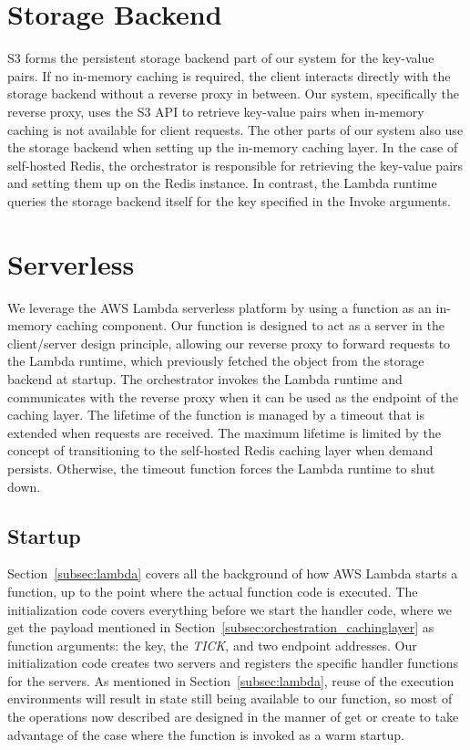 \section{Storage Backend}
\label{sec:storage_backend}
S3 forms the persistent storage backend part of our system for the key-value pairs. If no in-memory caching is required, the client interacts directly with the storage backend without a reverse proxy in between. Our system, specifically the reverse proxy, uses the S3 API to retrieve key-value pairs when in-memory caching is not available for client requests. The other parts of our system also use the storage backend when setting up the in-memory caching layer. In the case of self-hosted Redis, the orchestrator is responsible for retrieving the key-value pairs and setting them up on the Redis instance. In contrast, the Lambda runtime queries the storage backend itself for the key specified in the Invoke arguments.

\section{Serverless}
\label{sec:serverless}
We leverage the AWS Lambda serverless platform by using a function as an in-memory caching component. Our function is designed to act as a server in the client/server design principle, allowing our reverse proxy to forward  requests to the Lambda runtime, which previously fetched the object from the storage backend at startup. The orchestrator invokes the Lambda runtime and communicates with the reverse proxy when it can be used as the endpoint of the caching layer. The lifetime of the function is managed by a timeout that is extended when requests are received. The maximum lifetime is limited by the concept of transitioning to the self-hosted Redis caching layer when demand persists. Otherwise, the timeout function forces the Lambda runtime to shut down.

\subsection{Startup}
Section~\ref{subsec:lambda} covers all the background of how AWS Lambda starts a function, up to the point where the actual function code is executed. The initialization code covers everything before we start the handler code, where we get the payload mentioned in Section~\ref{subsec:orchestration_cachinglayer} as function arguments: the key, the \emph{TICK}, and two endpoint addresses. Our initialization code creates two servers and registers the specific handler functions for the servers. As mentioned in Section~\ref{subsec:lambda}, reuse of the execution environments will result in state still being available to our function, so most of the operations now described are designed in the manner of get or create to take advantage of the case where the function is invoked as a warm startup.


